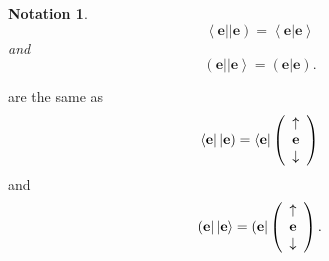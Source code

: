 \documentclass[aps,preprint]{revtex4}%
\newtheorem{notation}[theorem]{Notation}
\begin{document}
\begin{notation}%
\begin{equation}
\left\langle \mathbf{e}\right\vert \left\vert \mathbf{e}\right)  =\left\langle
\left.  \mathbf{e}\right\vert \mathbf{e}\right\rangle
\end{equation}
and
\begin{equation}
\left(  \mathbf{e}\right\vert \left\vert \mathbf{e}\right\rangle =\left(
\left.  \mathbf{e}\right\vert \mathbf{e}\right)  .
\end{equation}

\end{notation}

are the same as
\begin{equation}
\left\langle \mathbf{e}\right\vert \left\vert \mathbf{e}\right)  =\left\langle
\mathbf{e}\right\vert \left(
\begin{array}
[c]{c}%
\uparrow\\
\mathbf{e}\\
\downarrow
\end{array}
\right)
\end{equation}
and
\begin{equation}
\left(  \mathbf{e}\right\vert \left\vert \mathbf{e}\right\rangle =\left(
\mathbf{e}\right\vert \left(
\begin{array}
[c]{c}%
\uparrow\\
\mathbf{e}\\
\downarrow
\end{array}
\right)  .
\end{equation}
\end{document}
